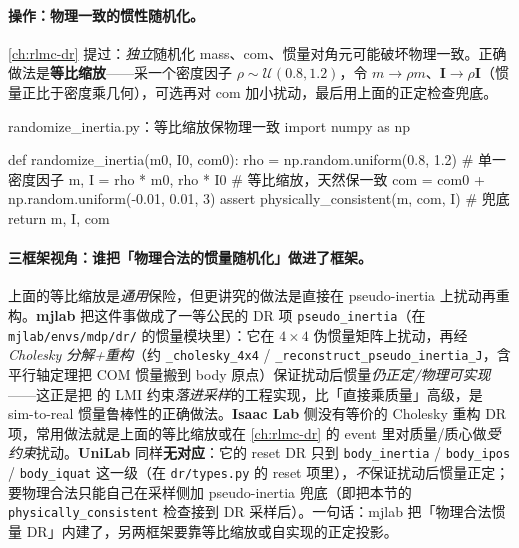 \paragraph{操作：物理一致的惯性随机化。}\cref{ch:rlmc-dr} 提过：\emph{独立}随机化 mass、com、惯量对角元可能破坏物理一致。正确做法是\textbf{等比缩放}——采一个密度因子 $\rho\sim\mathcal{U}(0.8,1.2)$，令 $m\!\to\!\rho m$、$\mathbf{I}\!\to\!\rho\mathbf{I}$（惯量正比于密度乘几何），可选再对 com 加小扰动，最后用上面的正定检查兜底。

\begin{codebox}[Python]{randomize\_inertia.py：等比缩放保物理一致}
import numpy as np

def randomize_inertia(m0, I0, com0):
    rho = np.random.uniform(0.8, 1.2)        # 单一密度因子
    m, I = rho * m0, rho * I0                 # 等比缩放，天然保一致
    com = com0 + np.random.uniform(-0.01, 0.01, 3)
    assert physically_consistent(m, com, I)  # 兜底
    return m, I, com
\end{codebox}

\paragraph{三框架视角：谁把「物理合法的惯量随机化」做进了框架。}上面的等比缩放是\emph{通用}保险，但更讲究的做法是直接在 pseudo-inertia 上扰动再重构。\textbf{mjlab} 把这件事做成了一等公民的 DR 项 \texttt{pseudo\_inertia}（在 \texttt{mjlab/envs/mdp/dr/} 的惯量模块里）：它在 $4\times4$ 伪惯量矩阵上扰动，再经 \emph{Cholesky 分解+重构}（约 \texttt{\_cholesky\_4x4} / \texttt{\_reconstruct\_pseudo\_inertia\_J}，含平行轴定理把 COM 惯量搬到 body 原点）保证扰动后惯量\emph{仍正定/物理可实现}——这正是把 \cite{wensing2018lmi} 的 LMI 约束\emph{落进采样}的工程实现，比「直接乘质量」高级，是 sim-to-real 惯量鲁棒性的正确做法。\textbf{Isaac Lab} 侧没有等价的 Cholesky 重构 DR 项，常用做法就是上面的等比缩放或在 \cref{ch:rlmc-dr} 的 event 里对质量/质心做\emph{受约束}扰动。\textbf{UniLab} 同样\textbf{无对应}：它的 reset DR 只到 \texttt{body\_inertia} / \texttt{body\_ipos} / \texttt{body\_iquat} 这一级（在 \texttt{dr/types.py} 的 reset 项里），\emph{不}保证扰动后惯量正定；要物理合法只能自己在采样侧加 pseudo-inertia 兜底（即把本节的 \texttt{physically\_consistent} 检查接到 DR 采样后）。一句话：mjlab 把「物理合法惯量 DR」内建了，另两框架要靠等比缩放或自实现的正定投影。

